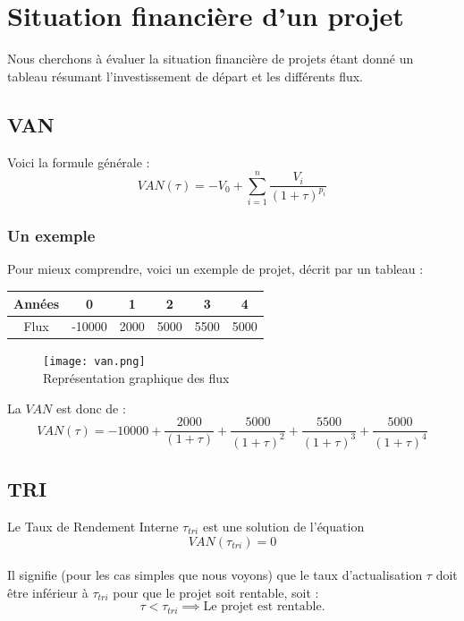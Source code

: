\documentclass{article}
\begin{document}
\section {Situation financière d'un projet}
Nous cherchons à évaluer la situation financière de projets étant donné un tableau résumant l'investissement de départ et les différents flux.
\subsection{VAN}
Voici la formule générale :
$$\boxed{VAN(\tau) = -V_0 + \sum_{i=1}^n \dfrac{V_i}{(1+\tau)^{p_i}}}$$

\subsubsection{Un exemple}
Pour mieux comprendre, voici un exemple de projet, décrit par un tableau : 
\begin{center}
\begin{tabular}{ |c|c|c|c|c|c| } 
 \hline
 Années & 0 & 1 & 2 & 3 & 4\\ \hline
 Flux & -10000 & 2000 & 5000 & 5500 & 5000\\ \hline
\end{tabular}
\end{center}

\begin{figure}[H]
    \centering
    \texttt{[image: van.png]}
    \\Représentation graphique des flux
\end{figure}

La $VAN$ est donc de :
$$VAN(\tau) = -10000 + \dfrac{2000}{(1+\tau)} + \dfrac{5000}{(1+\tau)^2} + \dfrac{5500}{(1+\tau)^3} + \dfrac{5000}{(1+\tau)^4}$$

\subsection{TRI}
Le Taux de Rendement Interne $\tau_{tri}$ est une solution de l'équation 
$$VAN(\tau_{tri}) = 0$$
%
\\Il signifie (pour les cas simples que nous voyons) que le taux d'actualisation $\tau$ doit être inférieur à $\tau_{tri}$ pour que le projet soit rentable, soit :
$$\tau < \tau_{tri} \implies \text{Le projet est rentable.}$$
\end{document}
